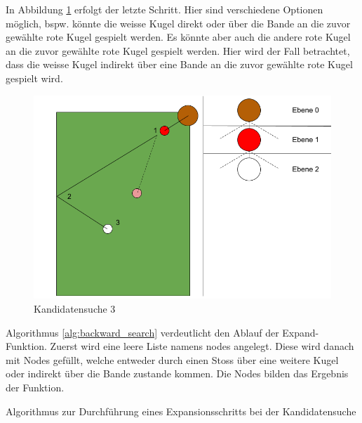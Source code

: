 In Abbildung \ref{fig:backwardsearch_3} erfolgt der letzte Schritt. Hier sind verschiedene Optionen möglich, bspw.
könnte die weisse Kugel direkt oder über die Bande an die zuvor gewählte rote Kugel gespielt werden. Es könnte aber auch
die andere rote Kugel an die zuvor gewählte rote Kugel gespielt werden. Hier wird der Fall betrachtet, dass die weisse Kugel
indirekt über eine Bande an die zuvor gewählte rote Kugel gespielt wird.
\begin{figure}[h!]
    \begin{center}
        \includegraphics[width=0.5\linewidth]{../common/03_billiard_ai/resources/13_backwardsearch_3.png}
    \end{center}
    \caption{Kandidatensuche 3}
    \label{fig:backwardsearch_3}
\end{figure}

Algorithmus \ref{alg:backward_search} verdeutlicht den Ablauf der \glqq Expand-Funktion\grqq. Zuerst wird eine
leere Liste namens \glqq nodes\grqq{} angelegt. Diese wird danach mit Nodes gefüllt, welche entweder durch einen Stoss
über eine weitere Kugel oder indirekt über die Bande zustande kommen. Die Nodes bilden das Ergebnis der Funktion.

\begin{algorithm}[H]
    \DontPrintSemicolon
    \caption{Algorithmus zur Durchführung eines Expansionsschritts bei der Kandidatensuche}
    \label{alg:backward_search}
\end{algorithm}

